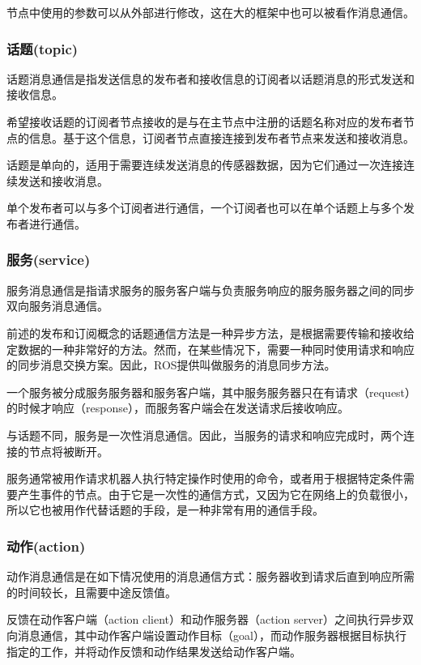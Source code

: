\documentclass[geye,green,kindle,cn]{elegantnote}
\begin{document}
节点中使用的参数可以从外部进行修改，这在大的框架中也可以被看作消息通信。
\subsubsection{话题(topic)}
话题消息通信是指发送信息的发布者和接收信息的订阅者以话题消息的形式发送和接收信息。

希望接收话题的订阅者节点接收的是与在主节点中注册的话题名称对应的发布者节点的信息。基于这个信息，订阅者节点直接连接到发布者节点来发送和接收消息。

话题是单向的，适用于需要连续发送消息的传感器数据，因为它们通过一次连接连续发送和接收消息。

单个发布者可以与多个订阅者进行通信，一个订阅者也可以在单个话题上与多个发布者进行通信。
\subsubsection{服务(service)}
服务消息通信是指请求服务的服务客户端与负责服务响应的服务服务器之间的同步双向服务消息通信。

前述的发布和订阅概念的话题通信方法是一种异步方法，是根据需要传输和接收给定数据的一种非常好的方法。然而，在某些情况下，需要一种同时使用请求和响应的同步消息交换方案。因此，ROS提供叫做服务的消息同步方法。

一个服务被分成服务服务器和服务客户端，其中服务服务器只在有请求（request）的时候才响应（response），而服务客户端会在发送请求后接收响应。

与话题不同，服务是一次性消息通信。因此，当服务的请求和响应完成时，两个连接的节点将被断开。

服务通常被用作请求机器人执行特定操作时使用的命令，或者用于根据特定条件需要产生事件的节点。由于它是一次性的通信方式，又因为它在网络上的负载很小，所以它也被用作代替话题的手段，是一种非常有用的通信手段。
\subsubsection{动作(action)}
动作消息通信是在如下情况使用的消息通信方式：服务器收到请求后直到响应所需的时间较长，且需要中途反馈值。

反馈在动作客户端（action client）和动作服务器（action server）之间执行异步双向消息通信，其中动作客户端设置动作目标（goal），而动作服务器根据目标执行指定的工作，并将动作反馈和动作结果发送给动作客户端。
\end{document}
